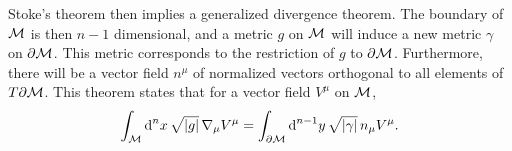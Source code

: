 Stoke's theorem then implies a generalized divergence theorem.
The boundary of $\mathcal{M}$ is then $n-1$ dimensional, and a metric $g$ on $\mathcal{M}$ will induce a new metric $\gamma$ on $\partial \mathcal{M}$.
This metric corresponds to the restriction of $g$ to $\partial \mathcal{M}$.
Furthermore, there will be a vector field $n^\mu$ of normalized vectors orthogonal to all elements of $T \partial \mathcal{M}$.
This theorem states that for a vector field $V^\mu$ on $\mathcal{M}$,
%
\begin{equation}
    \int_{\mathcal{M}} \text{d}^n x \, \sqrt{|g|} \,  \nabla_\mu V^\mu 
    = \int_{\partial \mathcal{M}} \text{d}^{n-1}y \, \sqrt{|\gamma|} \, n_\mu V^\mu.
\end{equation}
